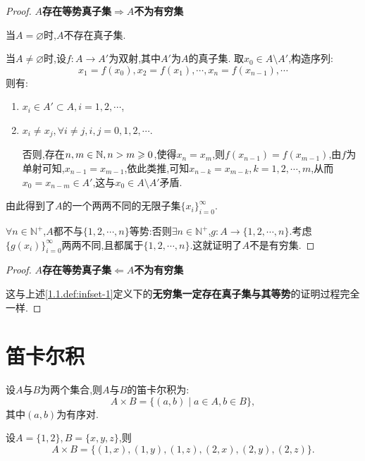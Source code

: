 \begin{proof}
    \textbf{$A$存在等势真子集$\Rightarrow A$不为有穷集}

    当$A=\varnothing$时,$A$不存在真子集.

    当$A\neq \varnothing$时,设$f:A\to A'$为双射,其中$A'$为$A$的真子集. 取$x_0 \in A \setminus A'$,构造序列:
    $$x_1 = f(x_0), x_2 = f(x_1), \cdots, x_n = f(x_{n-1}), \cdots$$
    则有:
    \begin{enumerate}[(1)]
        \item $x_i \in A' \subset A, i=1,2,\cdots$,
        \item $x_i \neq x_j, \forall i \neq j, i,j=0,1,2,\cdots$.

              否则,存在$n,m \in \mathbb{N}, n>m \geqslant 0$,使得$x_n = x_m$,则$f(x_{n-1}) = f(x_{m-1})$,由$f$为单射可知,$x_{n-1} = x_{m-1}$,依此类推,可知$x_{n-k} = x_{m-k}, k=1,2,\cdots,m$,从而$x_0 = x_{n-m} \in A'$,这与$x_0 \in A \setminus A'$矛盾.
    \end{enumerate}

    由此得到了$A$的一个两两不同的无限子集$\{ x_i \}_{i=0}^{\infty}$.

    $\forall n \in \mathbb{N}^+$,$A$都不与$\{1,2,\cdots,n\}$等势:否则$\exists n \in \mathbb{N}^+$,$g:A \to \{1,2,\cdots,n\}$.考虑$\{g(x_i)\}_{i = 0}^{\infty}$两两不同,且都属于$\{1,2,\cdots,n\}$.这就证明了$A$不是有穷集.
\end{proof}

\begin{proof}
    \textbf{$A$存在等势真子集$\Leftarrow A$不为有穷集}

    这与上述\autoref{1.1.def:infset-1}定义下的\textbf{无穷集一定存在真子集与其等势}的证明过程完全一样.
\end{proof}

\section{笛卡尔积}

\begin{definition}
    [笛卡尔积] 设$A$与$B$为两个集合,则$A$与$B$的笛卡尔积为:$$A \times B = \{ (a,b) \mid a \in A, b \in B \},$$其中$(a,b)$为有序对.
\end{definition}

\begin{example}
    设$A = \{1,2\}, B = \{x,y,z\}$,则$$A \times B = \{ (1,x), (1,y), (1,z), (2,x), (2,y), (2,z) \}.$$
\end{example}

